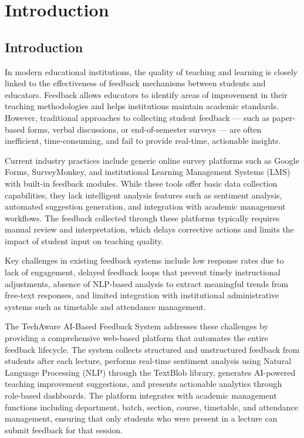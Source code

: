 
\chapter{Introduction}


\section{Introduction}

In modern educational institutions, the quality of teaching and learning is closely linked to the effectiveness of feedback mechanisms between students and educators. Feedback allows educators to identify areas of improvement in their teaching methodologies and helps institutions maintain academic standards. However, traditional approaches to collecting student feedback — such as paper-based forms, verbal discussions, or end-of-semester surveys — are often inefficient, time-consuming, and fail to provide real-time, actionable insights.

Current industry practices include generic online survey platforms such as Google Forms, SurveyMonkey, and institutional Learning Management Systems (LMS) with built-in feedback modules. While these tools offer basic data collection capabilities, they lack intelligent analysis features such as sentiment analysis, automated suggestion generation, and integration with academic management workflows. The feedback collected through these platforms typically requires manual review and interpretation, which delays corrective actions and limits the impact of student input on teaching quality.

Key challenges in existing feedback systems include low response rates due to lack of engagement, delayed feedback loops that prevent timely instructional adjustments, absence of NLP-based analysis to extract meaningful trends from free-text responses, and limited integration with institutional administrative systems such as timetable and attendance management.

The TechAware AI-Based Feedback System addresses these challenges by providing a comprehensive web-based platform that automates the entire feedback lifecycle. The system collects structured and unstructured feedback from students after each lecture, performs real-time sentiment analysis using Natural Language Processing (NLP) through the TextBlob library, generates AI-powered teaching improvement suggestions, and presents actionable analytics through role-based dashboards. The platform integrates with academic management functions including department, batch, section, course, timetable, and attendance management, ensuring that only students who were present in a lecture can submit feedback for that session.

